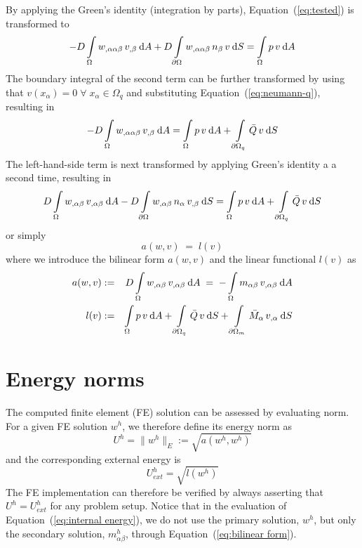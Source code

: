 \documentclass{article}
\def\dV{\:{\rm d}A}
\def\dA{\:{\rm d}S}
\begin{document}
By applying the Green's identity (integration by parts),
Equation~(\ref{eq:tested}) is transformed to
%
\begin{equation}
  -D\int\limits_\Omega w_{,\alpha\alpha\beta}\,v_{,\beta}\dV +
   D\int\limits_{\partial\Omega} w_{,\alpha\alpha\beta}\,n_\beta\,v\dA =
   \int\limits_\Omega p\,v\dV
\end{equation}
%
The boundary integral of the second term can be further transformed by using
that $v(x_\alpha)=0\;\forall\;x_\alpha\in\Omega_q$ and substituting
Equation~(\ref{eq:neumann-q}), resulting in
%
\begin{equation}
  -D\int\limits_\Omega w_{,\alpha\alpha\beta}\,v_{,\beta}\dV =
  \int\limits_\Omega p\,v\dV +
  \int\limits_{\partial\Omega_q} \bar{Q}\,v\dA
\end{equation}
%
The left-hand-side term is next transformed by applying Green's identity a
a second time, resulting in
%
\begin{equation}
  D\int\limits_\Omega w_{,\alpha\beta}\,v_{,\alpha\beta}\dV -
  D\int\limits_{\partial\Omega} w_{,\alpha\beta}\,n_\alpha\,v_{,\beta}\dA =
  \int\limits_\Omega p\,v\dV +
  \int\limits_{\partial\Omega_q} \bar{Q}\,v\dA
\end{equation}
%
or simply
%
\begin{equation}
  a(w,v) \;=\; l(v)
\end{equation}
%
where we introduce the bilinear form $a(w,v)$
and the linear functional $l(v)$ as
%
\begin{eqnarray}
  \label{eq:bilinear form}
  a(w,v) &:=& D\int\limits_\Omega w_{,\alpha\beta}\,v_{,\alpha\beta}\dV
         \;=\;-\int\limits_\Omega m_{\alpha\beta}\,v_{,\alpha\beta}\dV \\
  l(v)   &:=& \int\limits_\Omega p\,v\dV +
              \int\limits_{\partial\Omega_q} \bar{Q}\,v\dA +
              \int\limits_{\partial\Omega_m} \bar{M}_\alpha\,v_{,\alpha}\dA
\end{eqnarray}

\section{Energy norms}

The computed finite element (FE) solution can be assessed by evaluating norm.
For a given FE solution $w^h$, we therefore define its energy norm as
%
\begin{equation}
  \label{eq:internal energy}
  U^h = \|w^h\|_E := \sqrt{a(w^h,w^h)}
\end{equation}
%
and the corresponding external energy is
%
\begin{equation}
  U_{ext}^h = \sqrt{l(w^h)}
\end{equation}
%
The FE implementation can therefore be verified by always asserting that
$U^h=U_{ext}^h$ for any problem setup.
Notice that in the evaluation of Equation~(\ref{eq:internal energy}),
we do not use the primary solution, $w^h$,
but only the secondary solution, $m_{\alpha\beta}^h$,
through Equation~(\ref{eq:bilinear form}).
\end{document}
